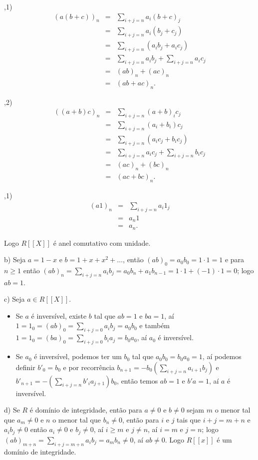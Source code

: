 \documentclass[10pt,a4paper]{article}
\begin{document}
\smallskip
{},1)
\[
\begin{array}{rcl}
(a(b+c))_n&=&\sum_{i+j=n}a_i(b+c)_j\\&=&\sum_{i+j=n}a_i(b_j+c_j)\\&=&\sum_{i+j=n}(a_ib_j+a_ic_j)\\&=&\sum_{i+j=n}a_ib_j+\sum_{i+j=n}a_ic_j\\&=&(ab)_n+(ac)_n\\&=&(ab+ac)_n.
\end{array}
\]

\smallskip
{},2)
\[
\begin{array}{rcl}
((a+b)c)_n&=&\sum_{i+j=n}(a+b)_ic_j\\&=&\sum_{i+j=n}(a_i+b_i)c_j\\&=&\sum_{i+j=n}(a_ic_j+b_ic_j)\\&=&\sum_{i+j=n}a_ic_j+\sum_{i+j=n}b_ic_j\\&=&(ac)_n+(bc)_n\\&=&(ac+bc)_n.
\end{array}
\]

\smallskip
{},1)
\[
\begin{array}{rcl}
(a1)_n&=&\sum_{i+j=n}a_i1_j\\&=&a_n1\\&=&a_n.
\end{array}
\]

\noindent
Logo $R[[X]]$ é anel comutativo com unidade.

\medskip
\noindent
b) Seja $a=1-x$ e $b=1+x+x^2+\dots$, então $(ab)_0=a_0b_0=1\cdot 1=1$ e para $n\geq 1$ então $(ab)_n=\sum_{i+j=n}a_ib_j=a_0b_n+a_1b_{n-1}=1\cdot1+(-1)\cdot 1=0$; logo $ab=1$.

\medskip
\noindent
c) Seja $a\in R[[X]]$.

\begin{itemize}
\item Se $a$ é inversível, existe $b$ tal que $ab=1$ e $ba=1$, aí $1=1_0=(ab)_0=\sum_{i+j=0}a_ib_j=a_0b_0$ e também $1=1_0=(ba)_0=\sum_{i+j=0}b_ia_j=b_0a_0$, aí $a_0$ é inversível.
\item Se $a_0$ é inversível, podemos ter um $b_0$ tal que $a_0b_0=b_0a_0=1$, aí podemos definir $b'_0=b_0$ e por recorrência $b_{n+1}=-b_0(\sum_{i+j=n}a_{i+1}b_j)$ e $b'_{n+1}=-(\sum_{i+j=n}b'_ia_{j+1})b_0$, então temos $ab=1$ e $b'a=1$, aí $a$ é inversível.
\end{itemize}

\noindent
d) Se $R$ é domínio de integridade, então para $a\neq 0$ e $b\neq 0$ sejam $m$ o menor tal que $a_m\neq 0$ e $n$ o menor tal que $b_n\neq 0$, então para $i$ e $j$ tais que $i+j=m+n$ e $a_ib_j\neq 0$ então $a_i\neq 0$ e $b_j\neq 0$, aí $i\geq m$ e $j\neq n$, aí $i=m$ e $j=n$; logo $(ab)_{m+n}=\sum_{i+j=m+n}a_ib_j=a_mb_n\neq 0$, aí $ab\neq 0$. Logo $R[[x]]$ é um domínio de integridade.
\end{document}
